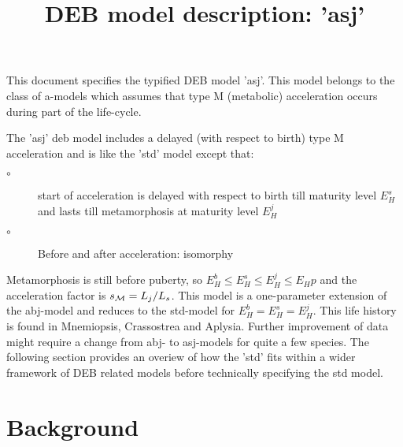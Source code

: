 \documentclass{article}
\title{DEB model description: 'asj'}
\begin{document}
\maketitle

This document specifies the typified DEB model 'asj'.
This model belongs to the class of a-models which assumes that type {\cal M} (metabolic) acceleration occurs during part of the life-cycle. 


The 'asj' {\sc deb} model includes a delayed (with respect to birth) type {\cal M} acceleration and is like the 'std' model except that:
\begin{description}
  \item[$\circ$] start of acceleration is delayed with respect to birth till maturity level $E_H^s$ and lasts till metamorphosis at maturity level $E_H^j$
	
  \item[$\circ$] Before and after acceleration: isomorphy
\end{description}
Metamorphosis is still before puberty, so $E_H^b \le E_H^s \le E_H^j \le E_Hp$ and the acceleration factor is $s_{\cal M} = L_j/ L_s$.
This model is a one-parameter extension of the abj-model and reduces to the std-model for $E_H^b = E_H^s = E_H^j$.
This life history is found in Mnemiopsis, Crassostrea and Aplysia.
Further improvement of data might require a change from abj- to asj-models for quite a few species.
The following section provides an overiew of how the 'std' fits within a wider framework of DEB related models before technically specifying the std model.

\section{Background}







\end{document}
